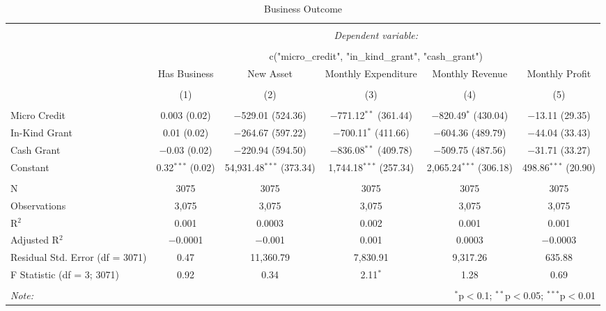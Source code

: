 
\begin{table}[!htbp] \centering 
  \caption{Business Outcome} 
  \label{} 
\small 
\begin{tabular}{@{\extracolsep{5pt}}lccccc} 
\\[-1.8ex]\hline 
\hline \\[-1.8ex] 
 & \multicolumn{5}{c}{\textit{Dependent variable:}} \\ 
\cline{2-6} 
\\[-1.8ex] & \multicolumn{5}{c}{c("micro\_credit", "in\_kind\_grant", "cash\_grant")} \\ 
 & Has Business & New Asset & Monthly Expenditure & Monthly Revenue & Monthly Profit \\ 
\\[-1.8ex] & (1) & (2) & (3) & (4) & (5)\\ 
\hline \\[-1.8ex] 
 Micro Credit & 0.003 (0.02) & $-$529.01 (524.36) & $-$771.12$^{**}$ (361.44) & $-$820.49$^{*}$ (430.04) & $-$13.11 (29.35) \\ 
  In-Kind Grant & 0.01 (0.02) & $-$264.67 (597.22) & $-$700.11$^{*}$ (411.66) & $-$604.36 (489.79) & $-$44.04 (33.43) \\ 
  Cash Grant & $-$0.03 (0.02) & $-$220.94 (594.50) & $-$836.08$^{**}$ (409.78) & $-$509.75 (487.56) & $-$31.71 (33.27) \\ 
  Constant & 0.32$^{***}$ (0.02) & 54,931.48$^{***}$ (373.34) & 1,744.18$^{***}$ (257.34) & 2,065.24$^{***}$ (306.18) & 498.86$^{***}$ (20.90) \\ 
 \hline \\[-1.8ex] 
N & 3075 & 3075 & 3075 & 3075 & 3075 \\ 
Observations & 3,075 & 3,075 & 3,075 & 3,075 & 3,075 \\ 
R$^{2}$ & 0.001 & 0.0003 & 0.002 & 0.001 & 0.001 \\ 
Adjusted R$^{2}$ & $-$0.0001 & $-$0.001 & 0.001 & 0.0003 & $-$0.0003 \\ 
Residual Std. Error (df = 3071) & 0.47 & 11,360.79 & 7,830.91 & 9,317.26 & 635.88 \\ 
F Statistic (df = 3; 3071) & 0.92 & 0.34 & 2.11$^{*}$ & 1.28 & 0.69 \\ 
\hline 
\hline \\[-1.8ex] 
\textit{Note:}  & \multicolumn{5}{r}{$^{*}$p$<$0.1; $^{**}$p$<$0.05; $^{***}$p$<$0.01} \\ 
\end{tabular} 
\end{table} 
